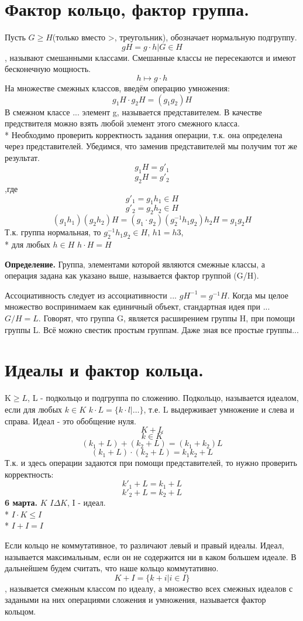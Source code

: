 \documentclass{article}
\begin{document}
\section*{Фактор кольцо, фактор группа.} Пусть $G\ge H$(только вместо >, треугольник), обозначает нормальную подгруппу. $$gH={g\cdot h|G\in H}$$, называют смешанными классами. Смешанные классы не пересекаются и имеют бесконечную мощность. $$h\mapsto g\cdot h$$
На множестве смежных классов, введём операцию умножения: $$g_1H\cdot g_2H=(g_1g_2)H$$
В смежном классе ... элемент g, называется представителем. В качестве предствителя можно взять любой  элемент  этого смежного класса.\\*
Необходимо проверить корректность задания операции, т.к. она определена через представителей. Убедимся, что  заменив представителей мы получим тот же результат.
$$g_1H=g'_1$$
$$g_2H=g'_2$$,где 
$$g'_1=g_1h_1\in H$$
$$g'_2=g_2h_2\in H$$
$$(g_1h_1)(g_2h_2)H=(g_1\cdot g_2)(g^{-1}_2h_1g_2)h_2H=g_1g_2H$$
Т.к. группа нормальная, то $g^{-1}_2h_1g_2\in H$, $h1=h3$,\\*
для любых $h\in H$ $h\cdot H=H$

{\bf Определение.} Группа, элементами которой являются смежные классы, а операция задана как указано выше, называется фактор группой (G/H).

Ассоциативность следует из ассоциативности ... $gH^{-1}=g^{-1}H$. Когда мы целое множество воспринимаем как единичный объект, стандартная идея при ... $G/H=L$. Говорят, что группа G, является расширением группы H, при помощи группы L. Всё можно свестик простым группам. Даже зная все простые группы...

\section*{Идеалы и фактор кольца.} K$\ge L$, L - подкольцо и подгруппа по сложению.
Подкольцо, называется идеалом, если для любых $k\in K$ $k\cdot L=\{k\cdot l|\ldots\}$, т.е. L выдерживает умножение и слева и справа. Идеал - это обобщение нуля.
$$K+L$$
$$k \in K$$
$$(k_1+L)+(k_2+L)=(k_1+k_2)L$$
$$(k_1+L)\cdot(k_2+L)=k_1k_2+L$$
Т.к. и здесь операции задаются при помощи представителей, то нужно проверить корректность:
$$k'_1+L=k_1+L$$
$$k'_2+L=k_2+L$$
\textbf{6 марта.}
$K$ $I\Delta K$, I - идеал.\\*
$I\cdot K\le I$\\*
$I+I=I$

Если кольцо не коммутативное, то различают левый и правый идеалы. Идеал, называется максимальным, если он не содержится ни в каком большем идеале. В дальнейшем будем считать, что наше кольцо коммутативно. $$K+I=\{k+i|i\in I\}$$, называется смежным классом по идеалу, а множество всех смежных идеалов с задаными на них операциями сложения и умножения, называется фактор кольцом.
\end{document}
